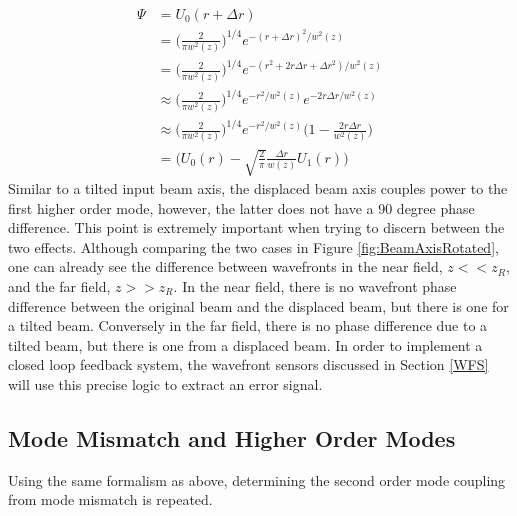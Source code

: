		\begin{equation}
		\begin{aligned}
			\Psi 	&=  		U_{0}(r + \Delta r	) 
			\\		&= 			\bigg( \frac{2}{\pi w^2(z)} \bigg)^{1/4}  e^{-(r+\Delta r)^2/w^2(z)}
			\\		&= 			\bigg( \frac{2}{\pi w^2(z)} \bigg)^{1/4}  e^{-(r^2 + 2r \Delta r  + \Delta r^2)/w^2(z)}
			\\		&\approx 	\bigg( \frac{2}{\pi w^2(z)} \bigg)^{1/4}  e^{-r^2/w^2(z)} e^{-2r \Delta r/w^2(z)}
			\\		&\approx 	\bigg( \frac{2}{\pi w^2(z)} \bigg)^{1/4}  e^{-r^2/w^2(z)} \bigg(1 - \frac{2r \Delta r}{w^2(z)} \bigg)
			\\		&=			\bigg( U_0(r) - \sqrt{\frac{2}{\pi}} \frac{\Delta r }{w(z)} U_1(r)	 \bigg)
		\end{aligned}
		\end{equation} 
		Similar to a tilted input beam axis, the displaced beam axis couples power to the first higher order mode, however, the latter does not have a 90 degree phase difference.  This point is extremely important when trying to discern between the two effects.  Although comparing the two cases in Figure \ref{fig:BeamAxisRotated}, one can already see the difference between wavefronts in the near field, $z<<z_R$, and the far field, $z>>z_R$.  In the near field, there is no wavefront phase difference between the original beam and the displaced beam, but there is one for a tilted beam.  Conversely in the far field, there is no phase difference due to a tilted beam, but there is one from a displaced beam.  In order to implement a closed loop feedback system, the wavefront sensors discussed in Section \ref{WFS} will use this precise logic to extract an error signal.
		
		\subsection{Mode Mismatch and Higher Order Modes}\label{Modemismatch}
		Using the same formalism as above, determining the second order mode coupling from mode mismatch is repeated.
		
